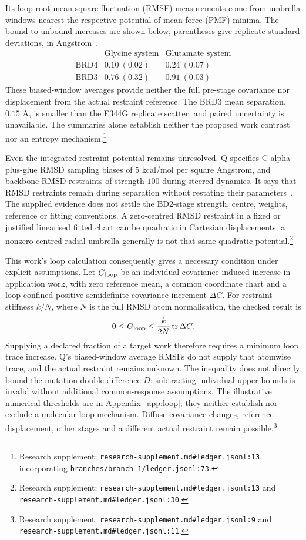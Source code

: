 \documentclass{article}
\begin{document}
Its loop root-mean-square fluctuation (RMSF) measurements come from umbrella windows nearest the respective potential-of-mean-force (PMF) minima. The bound-to-unbound increases are shown below; parentheses give replicate standard deviations, in Angstrom~\cite{Q}.
\[
\begin{array}{lcc}
 &\text{Glycine system}&\text{Glutamate system}\\
\text{BRD4}&0.10\ (0.02)&0.24\ (0.07)\\
\text{BRD3}&0.76\ (0.32)&0.91\ (0.03)
\end{array}
\]
These biased-window averages provide neither the full pre-stage covariance nor displacement from the actual restraint reference. The BRD3 mean separation, \(0.15\) \AA{}, is smaller than the E344G replicate scatter, and paired uncertainty is unavailable. The summaries alone establish neither the proposed work contrast nor an entropy mechanism.\footnote{Research supplement: \nolinkurl{research-supplement.md#ledger.jsonl:13}, incorporating \nolinkurl{branches/branch-1/ledger.jsonl:73}.}

Even the integrated restraint potential remains unresolved. Q specifies C-alpha-plus-glue RMSD sampling biases of \(5\) kcal/mol per square Angstrom, and backbone RMSD restraints of strength \(100\) during steered dynamics. It says that RMSD restraints remain during separation without restating their parameters~\cite{Q}. The supplied evidence does not settle the BD2-stage strength, centre, weights, reference or fitting conventions. A zero-centred RMSD restraint in a fixed or justified linearised fitted chart can be quadratic in Cartesian displacements; a nonzero-centred radial umbrella generally is not that same quadratic potential.\footnote{Research supplement: \nolinkurl{research-supplement.md#ledger.jsonl:13} and \nolinkurl{research-supplement.md#ledger.jsonl:30}.}

This work's loop calculation consequently gives a necessary condition under explicit assumptions. Let \(G_{\rm loop}\) be an individual covariance-induced increase in application work, with zero reference mean, a common coordinate chart and a loop-confined positive-semidefinite covariance increment \(\Delta C\). For restraint stiffness \(k/N\), where \(N\) is the full RMSD atom normalisation, the checked result is
\[
 0\leq G_{\rm loop}\leq\frac{k}{2N}\operatorname{tr}\Delta C.
\]
Supplying a declared fraction of a target work therefore requires a minimum loop trace increase. Q's biased-window average RMSFs do not supply that atomwise trace, and the actual restraint remains unknown. The inequality does not directly bound the mutation double difference \(D\): subtracting individual upper bounds is invalid without additional common-response assumptions. The illustrative numerical thresholds are in Appendix~\ref{app:loop}; they neither establish nor exclude a molecular loop mechanism. Diffuse covariance changes, reference displacement, other stages and a different actual restraint remain possible.\footnote{Research supplement: \nolinkurl{research-supplement.md#ledger.jsonl:9} and \nolinkurl{research-supplement.md#ledger.jsonl:11}.}
\end{document}
